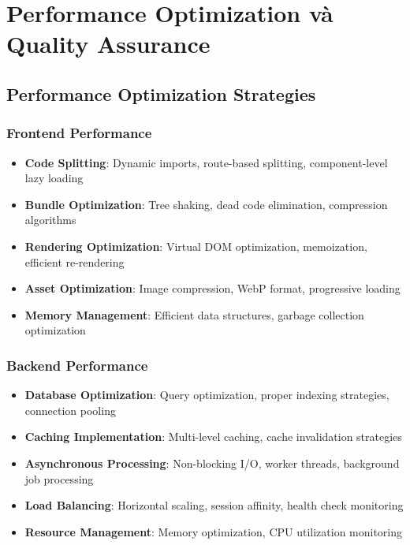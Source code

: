 \section{Performance Optimization và Quality Assurance}
\label{sec:performance-quality}

\subsection{Performance Optimization Strategies}
\label{subsec:performance-optimization}

\subsubsection{Frontend Performance}

\begin{itemize}
    \item \textbf{Code Splitting}: Dynamic imports, route-based splitting, component-level lazy loading
    \item \textbf{Bundle Optimization}: Tree shaking, dead code elimination, compression algorithms
    \item \textbf{Rendering Optimization}: Virtual DOM optimization, memoization, efficient re-rendering
    \item \textbf{Asset Optimization}: Image compression, WebP format, progressive loading
    \item \textbf{Memory Management}: Efficient data structures, garbage collection optimization
\end{itemize}

\subsubsection{Backend Performance}

\begin{itemize}
    \item \textbf{Database Optimization}: Query optimization, proper indexing strategies, connection pooling
    \item \textbf{Caching Implementation}: Multi-level caching, cache invalidation strategies
    \item \textbf{Asynchronous Processing}: Non-blocking I/O, worker threads, background job processing
    \item \textbf{Load Balancing}: Horizontal scaling, session affinity, health check monitoring
    \item \textbf{Resource Management}: Memory optimization, CPU utilization monitoring
\end{itemize}


